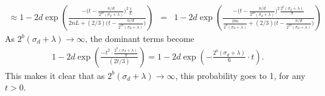 \documentclass[12pt]{article}
\begin{document}
\begin{eqnarray*}
	\approx 1 - 2d \exp \left(\frac{-\Big(t-\frac{n/d}{2^{2b}(\sigma_d + \lambda)}\Big)^2\frac{1}{L}}{2nL + (2/3)\Big(t-\frac{n/d}{2^{2b}(\sigma_d + \lambda)}\Big)} \right) &=& 1 - 2d \exp \left(\frac{-\Big(t-\frac{n/d}{2^{2b}(\sigma_d + \lambda)}\Big)^2\frac{2^b(\sigma_d + \lambda)}{9}}{\frac{18n}{2^b(\sigma_d + \lambda)} + (2/3)\Big(t-\frac{n/d}{2^{2b}(\sigma_d + \lambda)}\Big)} \right)
\end{eqnarray*}
As $2^b (\sigma_d +\lambda) \rightarrow \infty$, the dominant terms become
\begin{eqnarray*}
	1 - 2d \exp \left(\frac{-t^2 \cdot \frac{2^b(\sigma_d + \lambda)}{9}}{(2t/3)} \right) = 1 - 2d \exp \left(-  \frac{2^b(\sigma_d + \lambda)}{6}\cdot t \right).
\end{eqnarray*}
This makes it clear that as $2^b (\sigma_d + \lambda) \rightarrow \infty$, this probability goes to 1, for any $t > 0$.

\end{document}
